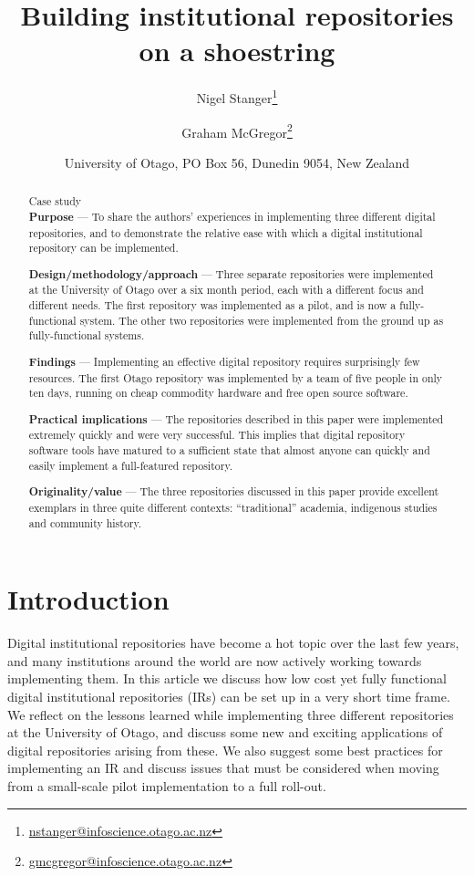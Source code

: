 \documentclass[12pt,pdftex,a4paper,titlepage]{article}
\title{Building institutional repositories on a shoestring}
\author{Nigel Stanger\thanks{\protect\url{nstanger@infoscience.otago.ac.nz}} \and Graham McGregor\thanks{\protect\url{gmcgregor@infoscience.otago.ac.nz}}}
\date{University of Otago, PO Box 56, Dunedin 9054, New Zealand}
\begin{document}
\maketitle




\begin{abstract}

\noindent Case study \\

\noindent\textbf{Purpose} --- To share the authors' experiences in implementing three different digital repositories, and to demonstrate the relative ease with which a digital institutional repository can be implemented.

\noindent\textbf{Design/methodology/approach} --- Three separate repositories were implemented at the University of Otago over a six month period, each with a different focus and different needs. The first repository was implemented as a pilot, and is now a fully-functional system. The other two repositories were implemented from the ground up as fully-functional systems.

\noindent\textbf{Findings} --- Implementing an effective digital repository requires surprisingly few resources. The first Otago repository was implemented by a team of five people in only ten days, running on cheap commodity hardware and free open source software.

\noindent\textbf{Practical implications} --- The repositories described in this paper were implemented extremely quickly and were very successful. This implies that digital repository software tools have matured to a sufficient state that almost anyone can quickly and easily implement a full-featured repository.

\noindent\textbf{Originality/value} --- The three repositories discussed in this paper provide excellent exemplars in three quite different contexts: ``traditional'' academia, indigenous studies and community history.
\end{abstract}


\section{Introduction}

Digital institutional repositories have become a hot topic over the last few years, and many institutions around the world are now actively working towards implementing them. In this article we discuss how low cost yet fully functional digital institutional repositories (IRs) can be set up in a very short time frame. We reflect on the lessons learned while implementing three different repositories at the University of Otago, and discuss some new and exciting applications of digital repositories arising from these. We also suggest some best practices for implementing an IR and discuss issues that must be considered when moving from a small-scale pilot implementation to a full roll-out.
\end{document}
